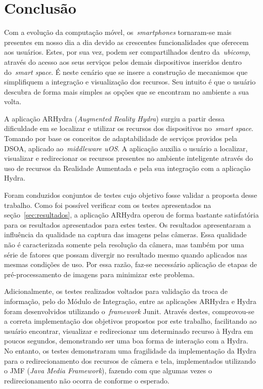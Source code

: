 \chapter{Conclusão}
\label{cap:conclusao}
	 
	
	Com a evolução da computação móvel, os~\textit{smartphones} tornaram-se mais presentes em nosso dia a dia devido as
	crescentes funcionalidades que oferecem aos usuários. Estes, por sua vez, podem ser 
	compartilhados dentro da~\textit{ubicomp}, através do acesso aos seus serviços pelos demais
	dispositivos inseridos dentro do~\textit{smart space}. É neste cenário que se insere a construção de mecanismos que 
	simplifiquem a integração e visualização dos recursos. Seu intuito é que o usuário descubra de forma mais simples as 
	opções que se encontram no ambiente a sua volta.
	 
 	A aplicação ARHydra (\textit{Augmented Reality Hydra}) surgiu a partir dessa dificuldade em se localizar
 	e utilizar os recursos dos dispositivos no~\textit{smart space}. Tomando por base os conceitos de adaptabilidade de 
 	serviços providos pela DSOA, aplicado ao~\textit{middleware uOS}. A aplicação auxilia o usuário a localizar, 
 	visualizar e redirecionar os recursos presentes no ambiente inteligente através do uso de 
 	recursos da Realidade Aumentada e pela sua integração com a aplicação Hydra. 
 	
 	 	
 	Foram conduzidos conjuntos de testes cujo objetivo fosse validar a proposta desse trabalho. Como foi possível 
 	verificar com os testes apresentados na seção~\ref{sec:resultados}, a aplicação ARHydra operou de forma bastante
 	satisfatória para os resultados apresentados para estes testes.	Os resultados apresentaram a influência da 
 	qualidade na captura das imagens pelas câmeras. Essa qualidade não é caracterizada somente pela 
 	resolução da câmera, mas também por uma série de fatores que possam divergir no resultado mesmo quando aplicados 
 	nas mesmas condições de uso. Por essa razão, faz-se necessário aplicação de etapas de pré-processamento de 
 	imagens para minimizar este problema.
 	
 	Adicionalmente, os testes realizados voltados para validação da troca de informação, pelo do Módulo de Integração, 
 	entre as aplicações ARHydra e Hydra foram desenvolvidos utilizando o~\textit{framework} Junit. 
 	Através destes, comprovou-se a correta implementação dos objetivos propostos por este trabalho, facilitando ao 
 	usuário encontrar, visualizar e redirecionar um determinado	recurso à Hydra em poucos segundos, demonstrando ser 
 	uma boa forma de interação com a Hydra. No entanto, os testes demonstraram 
 	uma fragilidade da implementação da Hydra para o redirecionamento dos recursos de câmera e tela, implementados 
 	utilizando o JMF (\textit{Java Media Framework}), fazendo com que algumas vezes o redirecionamento não ocorra de
 	conforme o esperado.
 	
